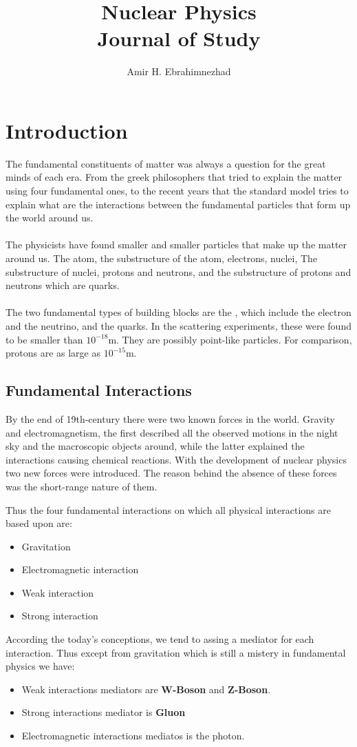 \documentclass[10pt,onecolumn]{article}
\title{Nuclear Physics \\ \large Journal of Study}
\author{Amir H. Ebrahimnezhad}
\newcommand{\break}{\\ \\}
\begin{document}
\maketitle
\tableofcontents

\section{Introduction}
The fundamental constituents of matter was always a question for the great minds of each era. From the greek philosophers that tried to explain the matter using four fundamental ones, to the recent years that the standard model tries to explain what are the interactions between the fundamental particles that form up the world around us.
\break
The physicists have found smaller and smaller particles that make up the matter around us. The atom, the substructure of the atom, electrons, nuclei, The substructure of nuclei, protons and neutrons, and the substructure of protons and neutrons which are quarks. 
\break
The two fundamental types of building blocks are the , which include the electron and the neutrino, and the quarks. In the scattering experiments, these were found to be smaller than $10^{-18}$m. They are possibly point-like particles.  For comparison, protons are as large as $10^{-15}$m. 

\subsection{Fundamental Interactions}
By the end of 19th-century there were two known forces in the world. Gravity and electromagnetism, the first described all the observed motions in the night sky and the macroscopic objects around, while the latter explained the interactions causing chemical reactions. With the development of nuclear physics two new forces were introduced. The reason behind the absence of these forces was the short-range nature of them.

Thus the four fundamental interactions on which all physical interactions are based upon are:
\begin{itemize}
     \item Gravitation
     \item Electromagnetic interaction
     \item Weak interaction
     \item Strong interaction
\end{itemize}

According the today's conceptions, we tend to assing a mediator for each interaction. Thus except from gravitation which is still a mistery in fundamental physics we have:

\begin{itemize}
     \item Weak interactions mediators are \textbf{W-Boson} and \textbf{Z-Boson}.
     \item Strong interactions mediator is \textbf{Gluon}
     \item Electromagnetic interactions mediatos is the photon.
\end{itemize}
\end{document}
